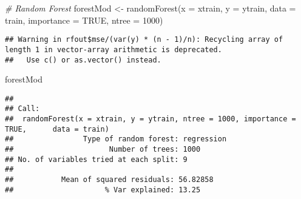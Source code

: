 \documentclass[
]{article}
\newenvironment{Shaded}{\begin{snugshade}}{\end{snugshade}}
\newcommand{\AttributeTok}[1]{\textcolor[rgb]{0.77,0.63,0.00}{#1}}
\newcommand{\CommentTok}[1]{\textcolor[rgb]{0.56,0.35,0.01}{\textit{#1}}}
\newcommand{\ConstantTok}[1]{\textcolor[rgb]{0.00,0.00,0.00}{#1}}
\newcommand{\DecValTok}[1]{\textcolor[rgb]{0.00,0.00,0.81}{#1}}
\newcommand{\FunctionTok}[1]{\textcolor[rgb]{0.00,0.00,0.00}{#1}}
\newcommand{\NormalTok}[1]{#1}
\newcommand{\OtherTok}[1]{\textcolor[rgb]{0.56,0.35,0.01}{#1}}
\newcommand{\SpecialCharTok}[1]{\textcolor[rgb]{0.00,0.00,0.00}{#1}}
\begin{document}
\begin{Shaded}
\end{Shaded}

\begin{Shaded}
\begin{Highlighting}[]
\CommentTok{\# Random Forest}
\NormalTok{forestMod }\OtherTok{\textless{}{-}} \FunctionTok{randomForest}\NormalTok{(}\AttributeTok{x =}\NormalTok{ xtrain, }\AttributeTok{y =}\NormalTok{ ytrain, }\AttributeTok{data =}\NormalTok{ train, }\AttributeTok{importance =} \ConstantTok{TRUE}\NormalTok{, }\AttributeTok{ntree =} \DecValTok{1000}\NormalTok{)}
\end{Highlighting}
\end{Shaded}

\begin{verbatim}
## Warning in rfout$mse/(var(y) * (n - 1)/n): Recycling array of length 1 in vector-array arithmetic is deprecated.
##   Use c() or as.vector() instead.
\end{verbatim}

\begin{Shaded}
\begin{Highlighting}[]
\NormalTok{forestMod}
\end{Highlighting}
\end{Shaded}

\begin{verbatim}
## 
## Call:
##  randomForest(x = xtrain, y = ytrain, ntree = 1000, importance = TRUE,      data = train) 
##                Type of random forest: regression
##                      Number of trees: 1000
## No. of variables tried at each split: 9
## 
##           Mean of squared residuals: 56.82858
##                     % Var explained: 13.25
\end{verbatim}

\begin{Shaded}
\end{Shaded}
\end{document}
